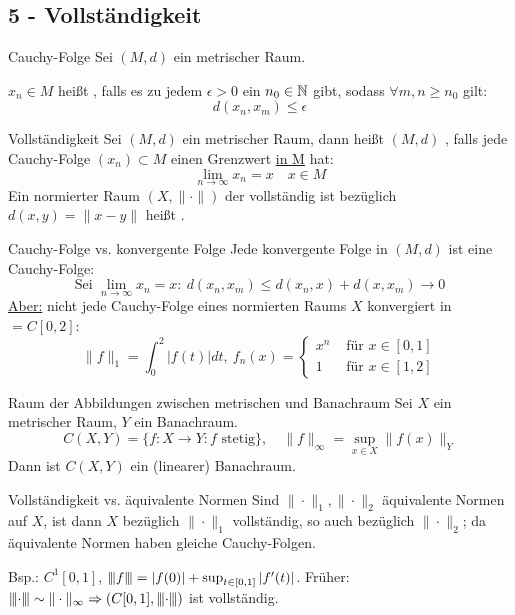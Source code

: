 \subsection*{5 - Vollst{\"a}ndigkeit}

	\begin{karte}{Cauchy-Folge}
		Sei $(M, d)$ ein metrischer Raum.
		
		 $x_{n} \in M$ hei{\ss}t , falls es zu jedem $\epsilon > 0$ ein $n_{0} \in \mathbb{N}$ gibt, sodass $\forall m, n \geq n_{0}$ gilt:
			\[ d(x_{n}, x_{m}) \leq \epsilon \]	
	\end{karte}
	
	\begin{karte}{Vollständigkeit}
		Sei $(M, d)$ ein metrischer Raum, dann hei{\ss}t $(M, d)$ , falls jede Cauchy-Folge $(x_{n}) \subset M$ einen Grenzwert \uline{in M} hat:
			\[ \lim_{n \rightarrow \infty} x_{n} = x \quad x \in M \]
		Ein normierter Raum $(X, \| \cdot \|)$ der vollständig ist bezüglich $d(x, y) = \| x - y \|$ heißt .
	\end{karte}
	
	\begin{karte}{Cauchy-Folge vs. konvergente Folge}
		Jede konvergente Folge in $(M, d)$ ist eine Cauchy-Folge:
			\[ \text{Sei } \lim_{n \rightarrow \infty} x_{n} = x: ~ d(x_{n}, x_{m}) \leq d(x_{n}, x) + d(x, x_{m}) \rightarrow 0 \]
		 	\uline{Aber:} nicht jede Cauchy-Folge eines normierten Raums $X$ konvergiert in $ = C[0, 2]$:
			\[ \| f \|_{1} = \int_{0}^{2} | f(t) | dt, ~ f_{n}(x) = \begin{cases}x^{n} & \text{ für } x \in [0, 1] \\ 1 & \text{ für } x \in [1, 2]\end{cases} \]
	\end{karte}

	\begin{karte}{Raum der Abbildungen zwischen metrischen und Banachraum}	
		Sei $X$ ein metrischer Raum, $Y$ ein Banachraum.
		\[ C(X, Y) = \{ f \colon X \rightarrow Y: f \text{ stetig} \}, \quad \| f \|_{\infty} = \sup_{x \in X} \| f(x) \|_{Y} \]
		Dann ist $C(X, Y)$ ein (linearer) Banachraum.
	\end{karte}
	
	\begin{karte}{Vollständigkeit vs. äquivalente Normen}		
		Sind $\| \cdot \|_{1}, \| \cdot \|_{2}$ äquivalente Normen auf $X$, ist dann $X$ bezüglich $\| \cdot \|_{1}$ vollständig, so auch bezüglich $\| \cdot \|_{2}$; da äquivalente Normen haben gleiche Cauchy-Folgen.
	
		Bsp.: $C^{1}[0, 1]$, ${\left\vert\kern-0.25ex\left\vert\kern-0.25ex\left\vert f\right\vert\kern-0.25ex\right\vert\kern-0.25ex\right\vert} = |f(0)| + \sup_{t \in [0, 1]} | f'(t) |$. Früher: ${\left\vert\kern-0.25ex\left\vert\kern-0.25ex\left\vert\cdot\right\vert\kern-0.25ex\right\vert\kern-0.25ex\right\vert} \sim \| \cdot \|_{\infty} \Rightarrow \left( C[0, 1], {\left\vert\kern-0.25ex\left\vert\kern-0.25ex\left\vert\cdot\right\vert\kern-0.25ex\right\vert\kern-0.25ex\right\vert} \right)$ ist vollständig.
	\end{karte}

